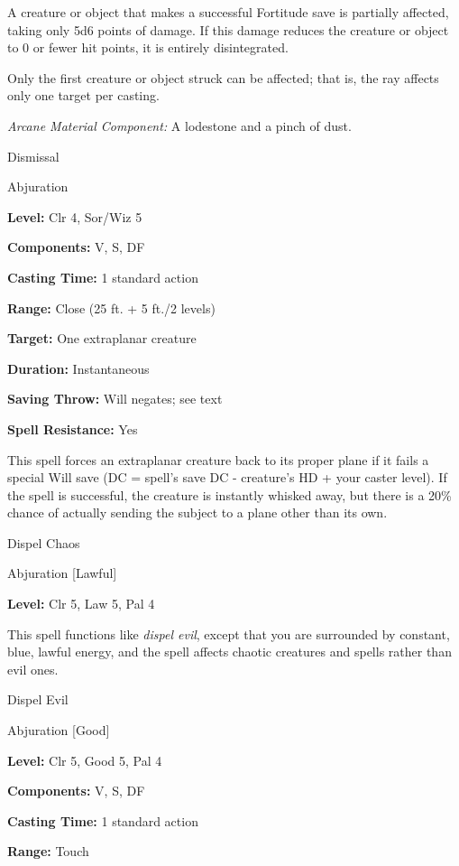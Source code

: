 \documentclass{article}
\begin{document}
A creature or object that makes a successful Fortitude save is partially affected, 
taking only 5d6 points of damage. If this damage reduces the creature or object 
to 0 or fewer hit points, it is entirely disintegrated.

Only the first creature or object struck can be affected; that is, the ray affects 
only one target per casting.

\textit{Arcane Material Component: }A lodestone and a pinch of dust.

\vspace{12pt}
Dismissal

Abjuration

\textbf{Level:} Clr 4, Sor/Wiz 5

\textbf{Components:} V, S, DF

\textbf{Casting Time:} 1 standard action

\textbf{Range:} Close (25 ft. + 5 ft./2 levels)

\textbf{Target:} One extraplanar creature

\textbf{Duration:} Instantaneous

\textbf{Saving Throw: }Will negates; see text

\textbf{Spell Resistance:} Yes

This spell forces an extraplanar creature back to its proper plane if it fails 
a special Will save (DC = spell's save DC - creature's HD + your caster level). 
If the spell is successful, the creature is instantly whisked away, but there is 
a 20\% chance of actually sending the subject to a plane other than its own.

\vspace{12pt}
Dispel Chaos

Abjuration [Lawful]

\textbf{Level:} Clr 5, Law 5, Pal 4

This spell functions like \textit{dispel evil}, except that you are surrounded 
by constant, blue, lawful energy, and the spell affects chaotic creatures and spells 
rather than evil ones.

\vspace{12pt}
Dispel Evil

Abjuration [Good]

\textbf{Level:} Clr 5, Good 5, Pal 4

\textbf{Components:} V, S, DF

\textbf{Casting Time:} 1 standard action

\textbf{Range:} Touch
\end{document}

